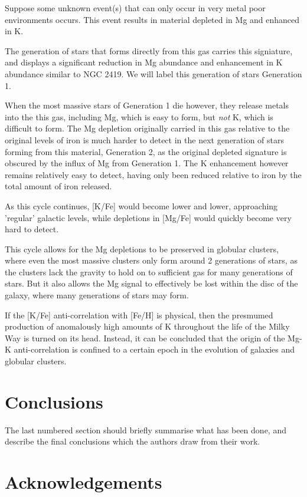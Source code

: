 \documentclass[a4paper,fleqn,usenatbib]{mnras}
\begin{document}
Suppose some unknown event(s) that can only occur in very metal poor environments occurs. This event results in material depleted in Mg and enhanced in K.

The generation of stars that forms directly from this gas carries this signiature, and displays a significant reduction in Mg abundance and enhancement in K abundance similar to NGC 2419. We will label this generation of stars Generation 1.

When the most massive stars of Generation 1 die however, they release metals into the this gas, including Mg, which is easy to form, but \textit{not} K, which is difficult to form. The Mg depletion originally carried in this gas relative to the original levels of iron is much harder to detect in the next generation of stars forming from this material, Generation 2, as the original depleted signature is obscured by the influx of Mg from Generation 1. The K enhancement however remains relatively easy to detect, having only been reduced relative to iron by the total amount of iron released.

As this cycle continues, [K/Fe] would become lower and lower, approaching 'regular' galactic levels, while depletions in [Mg/Fe] would quickly become very hard to detect.

This cycle allows for the Mg depletions to be preserved in globular clusters, where even the most massive clusters only form around 2 generations of stars, as the clusters lack the gravity to hold on to sufficient gas for many generations of stars. But it also allows the Mg signal to effectively be lost within the disc of the galaxy, where many generations of stars may form.

If the [K/Fe] anti-correlation with [Fe/H] is physical, then the presmumed production of anomalously high amounts of K throughout the life of the Milky Way is turned on its head. Instead, it can be concluded that the origin of the Mg-K anti-correlation is confined to a certain epoch in the evolution of galaxies and globular clusters.


\section{Conclusions}

The last numbered section should briefly summarise what has been done, and describe
the final conclusions which the authors draw from their work.

\section*{Acknowledgements}
\end{document}
